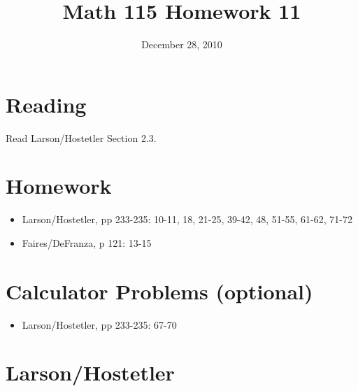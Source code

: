 \documentclass[fleqn,addpoints]{exam}
\title{Math 115 Homework 11}
\date{December 28, 2010}
\begin{document}
\maketitle
 

\ifprintanswers
\else
\section{Reading}
Read Larson/Hostetler Section 2.3.

\section{Homework}

\begin{itemize}
  \item Larson/Hostetler, pp 233-235: 10-11, 18, 21-25, 39-42, 48, 51-55, 61-62, 71-72
  \item Faires/DeFranza, p 121: 13-15
\end{itemize}

\section{Calculator Problems (optional)}
\begin{itemize}
  \item Larson/Hostetler, pp 233-235: 67-70
\end{itemize}

\fi

\ifprintanswers

\section{Larson/Hostetler}
\end{document}
